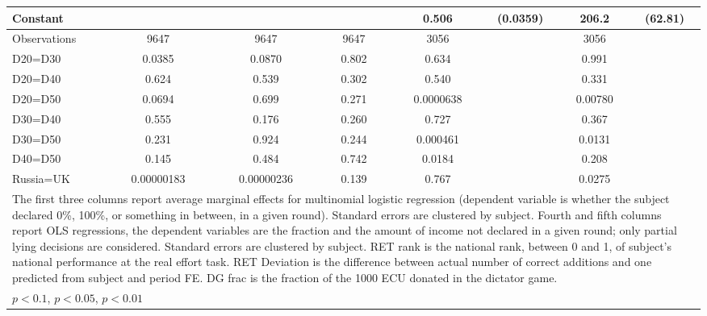 \begin{tabular}{l|cccccc|cc|cc}
Constant        &                  &         &                  &         &                  &         &    0.506\sym{***}& (0.0359)&    206.2\sym{***}&  (62.81)\\
\hline
Observations    &     9647         &         &     9647         &         &     9647         &         &     3056         &         &     3056         &         \\
D20=D30         &   0.0385         &         &   0.0870         &         &    0.802         &         &    0.634         &         &    0.991         &         \\
D20=D40         &    0.624         &         &    0.539         &         &    0.302         &         &    0.540         &         &    0.331         &         \\
D20=D50         &   0.0694         &         &    0.699         &         &    0.271         &         &0.0000638         &         &  0.00780         &         \\
D30=D40         &    0.555         &         &    0.176         &         &    0.260         &         &    0.727         &         &    0.367         &         \\
D30=D50         &    0.231         &         &    0.924         &         &    0.244         &         & 0.000461         &         &   0.0131         &         \\
D40=D50         &    0.145         &         &    0.484         &         &    0.742         &         &   0.0184         &         &    0.208         &         \\
Russia=UK       &0.00000183         &         &0.00000236         &         &    0.139         &         &    0.767         &         &   0.0275         &         \\
\hline\hline
\multicolumn{11}{p{18cm}}{\tiny The first three columns report average marginal effects for multinomial logistic regression (dependent variable is whether the subject declared 0\%, 100\%, or something in between, in a given round). Standard errors are clustered by subject. Fourth and fifth columns report OLS regressions, the dependent variables are the fraction and the amount of income not declared in a given round; only partial lying decisions are considered. Standard errors are clustered by subject. RET rank is the national rank, between 0 and 1, of subject's national performance at the real effort task. RET Deviation is the difference between actual number of correct additions and one predicted from subject and period FE. DG frac is the fraction of the 1000 ECU donated in the dictator game.}\\
\multicolumn{11}{l}{\tiny \sym{*} \(p<0.1\), \sym{**} \(p<0.05\), \sym{***} \(p<0.01\)}\\
\end{tabular}